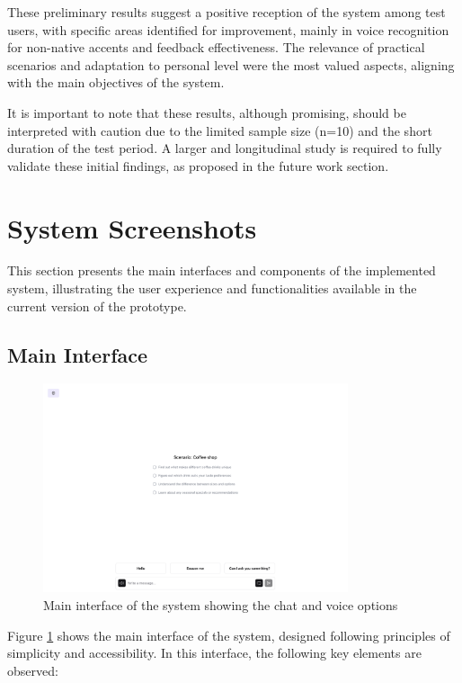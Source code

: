 These preliminary results suggest a positive reception of the system among test users, with specific areas identified for improvement, mainly in voice recognition for non-native accents and feedback effectiveness. The relevance of practical scenarios and adaptation to personal level were the most valued aspects, aligning with the main objectives of the system.

It is important to note that these results, although promising, should be interpreted with caution due to the limited sample size (n=10) and the short duration of the test period. A larger and longitudinal study is required to fully validate these initial findings, as proposed in the future work section.

\section{System Screenshots}
\label{capturas-sistema}

This section presents the main interfaces and components of the implemented system, illustrating the user experience and functionalities available in the current version of the prototype.

\subsection{Main Interface}
\label{interfaz-principal}

\begin{figure}[H]
    \centering
    \includegraphics[width=0.8\textwidth]{figuras/screenshots/chat-initial.png}
    \caption{Main interface of the system showing the chat and voice options}
    \label{fig:main-interface}
\end{figure}


Figure \ref{fig:main-interface} shows the main interface of the system, designed following principles of simplicity and accessibility. In this interface, the following key elements are observed:

